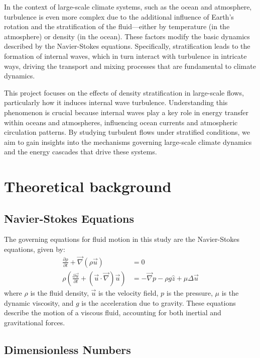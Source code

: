 \documentclass[final,5p,times,twocolumn,authoryear]{elsarticle}
\newcommand{\pd}[2]{\frac{\partial #1}{\partial #2}}
\begin{document}
In the context of large-scale climate systems, such as the ocean and atmosphere, turbulence is even more complex due to the additional influence of Earth’s rotation and the stratification of the fluid—either by temperature (in the atmosphere) or density (in the ocean). These factors modify the basic dynamics described by the Navier-Stokes equations. Specifically, stratification leads to the formation of internal waves, which in turn interact with turbulence in intricate ways, driving the transport and mixing processes that are fundamental to climate dynamics.

This project focuses on the effects of density stratification in large-scale flows, particularly how it induces internal wave turbulence. Understanding this phenomenon is crucial because internal waves play a key role in energy transfer within oceans and atmospheres, influencing ocean currents and atmospheric circulation patterns. By studying turbulent flows under stratified conditions, we aim to gain insights into the mechanisms governing large-scale climate dynamics and the energy cascades that drive these systems.


\section{Theoretical background}
\subsection{Navier-Stokes Equations}

The governing equations for fluid motion in this study are the Navier-Stokes equations, given by:
\begin{subequations}
\begin{align}
\pd{\rho}{t} + \vec{\nabla} \left( \rho \vec{u} \right) &= 0 \\
\rho \left( \pd{\vec{u}}{t} + \left( \vec{u} \cdot \vec{\nabla} \right) \vec{u} \right) &= - \vec{\nabla} p - \rho g \hat{z} + \mu \Delta \vec{u}
\end{align}
\label{eq:NS}
\end{subequations}
where $\rho$ is the fluid density, $\vec{u}$ is the velocity field, $p$ is the pressure, $\mu$ is the dynamic viscosity, and $g$ is the acceleration due to gravity. These equations describe the motion of a viscous fluid, accounting for both inertial and gravitational forces.

\subsection{Dimensionless Numbers}
\end{document}
